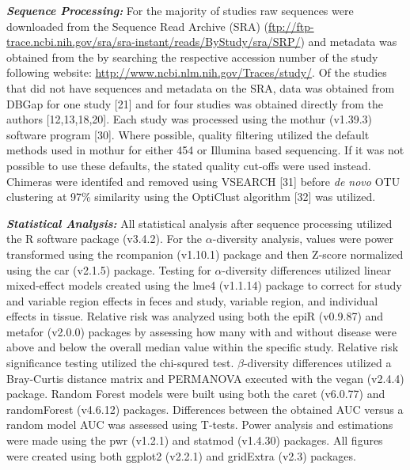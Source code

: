 \documentclass[12pt,]{article}
\begin{document}
\textbf{\emph{Sequence Processing:}} For the majority of studies raw
sequences were downloaded from the Sequence Read Archive (SRA)
(\url{ftp://ftp-trace.ncbi.nih.gov/sra/sra-instant/reads/ByStudy/sra/SRP/})
and metadata was obtained from the by searching the respective accession
number of the study following website:
\url{http://www.ncbi.nlm.nih.gov/Traces/study/}. Of the studies that did
not have sequences and metadata on the SRA, data was obtained from DBGap
for one study {[}21{]} and for four studies was obtained directly from
the authors {[}12,13,18,20{]}. Each study was processed using the mothur
(v1.39.3) software program {[}30{]}. Where possible, quality filtering
utilized the default methods used in mothur for either 454 or Illumina
based sequencing. If it was not possible to use these defaults, the
stated quality cut-offs were used instead. Chimeras were identifed and
removed using VSEARCH {[}31{]} before \emph{de novo} OTU clustering at
97\% similarity using the OptiClust algorithm {[}32{]} was utilized.

\textbf{\emph{Statistical Analysis:}} All statistical analysis after
sequence processing utilized the R software package (v3.4.2). For the
\(\alpha\)-diversity analysis, values were power transformed using the
rcompanion (v1.10.1) package and then Z-score normalized using the car
(v2.1.5) package. Testing for \(\alpha\)-diversity differences utilized
linear mixed-effect models created using the lme4 (v1.1.14) package to
correct for study and variable region effects in feces and study,
variable region, and individual effects in tissue. Relative risk was
analyzed using both the epiR (v0.9.87) and metafor (v2.0.0) packages by
assessing how many with and without disease were above and below the
overall median value within the specific study. Relative risk
significance testing utilized the chi-squred test. \(\beta\)-diversity
differences utilized a Bray-Curtis distance matrix and PERMANOVA
executed with the vegan (v2.4.4) package. Random Forest models were
built using both the caret (v6.0.77) and randomForest (v4.6.12)
packages. Differences between the obtained AUC versus a random model AUC
was assessed using T-tests. Power analysis and estimations were made
using the pwr (v1.2.1) and statmod (v1.4.30) packages. All figures were
created using both ggplot2 (v2.2.1) and gridExtra (v2.3) packages.
\end{document}
